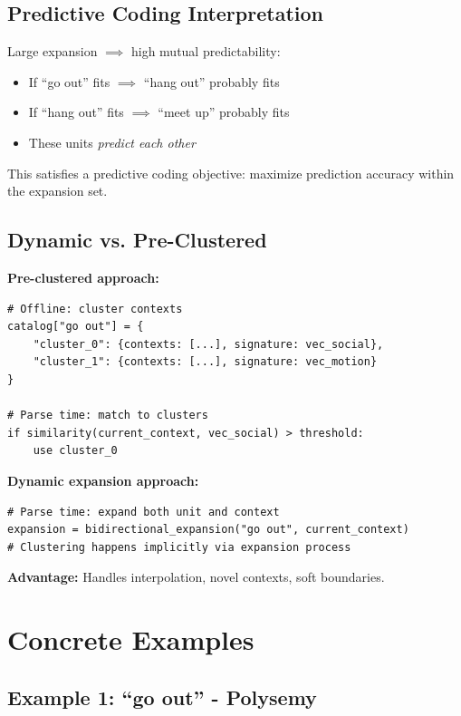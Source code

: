 \documentclass[11pt]{article}
\begin{document}
\subsection{Predictive Coding Interpretation}

Large expansion $\implies$ high mutual predictability:
\begin{itemize}
\item If ``go out'' fits $\implies$ ``hang out'' probably fits
\item If ``hang out'' fits $\implies$ ``meet up'' probably fits
\item These units \emph{predict each other}
\end{itemize}

This satisfies a predictive coding objective: maximize prediction accuracy within the expansion set.

\subsection{Dynamic vs. Pre-Clustered}

\textbf{Pre-clustered approach:}
\begin{lstlisting}[basicstyle=\small\ttfamily]
# Offline: cluster contexts
catalog["go out"] = {
    "cluster_0": {contexts: [...], signature: vec_social},
    "cluster_1": {contexts: [...], signature: vec_motion}
}

# Parse time: match to clusters
if similarity(current_context, vec_social) > threshold:
    use cluster_0
\end{lstlisting}

\textbf{Dynamic expansion approach:}
\begin{lstlisting}[basicstyle=\small\ttfamily]
# Parse time: expand both unit and context
expansion = bidirectional_expansion("go out", current_context)
# Clustering happens implicitly via expansion process
\end{lstlisting}

\textbf{Advantage:} Handles interpolation, novel contexts, soft boundaries.

\section{Concrete Examples}

\subsection{Example 1: ``go out'' - Polysemy}
\end{document}
